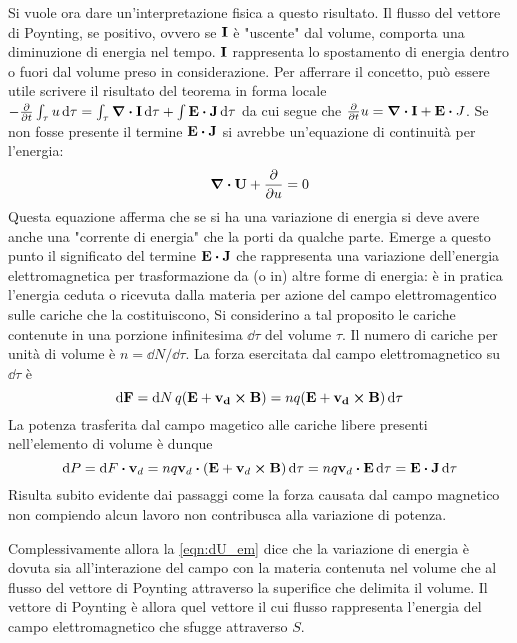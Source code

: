 Si vuole ora dare un'interpretazione fisica a questo risultato.
Il flusso del vettore di Poynting, se positivo, ovvero se $\vb{I}$ è "uscente" dal volume,
comporta una diminuzione di energia nel tempo. $\vb{I}$ rappresenta lo spostamento di
energia dentro o fuori dal volume preso in considerazione. Per afferrare il concetto, può essere
utile scrivere il risultato del teorema in forma locale
$-\pdv{t}\int_\tau u \dd{\tau}=\int_\tau \div{\vb{I}} \dd{\tau} +\int \vb{E}\vdot\vb{J}\dd{\tau}$
da cui segue che $\-\pdv{t}u=\div{\vb{I}}+\vb{E}\vdot{J}$. Se non fosse presente il termine
$\vb{E}\vdot\vb{J}$ si avrebbe un'equazione di continuità per l'energia:
\[
    \div{\vb{U}}+\pdv{u}=0
\]
Questa equazione afferma che se si ha una variazione di energia si deve avere anche una "corrente di energia"
che la porti da qualche parte. Emerge a questo punto il significato del termine $\vb{E}\vdot\vb{J}$ che
rappresenta una variazione dell'energia elettromagnetica per trasformazione da (o in) altre forme di energia: è
in pratica l'energia ceduta o ricevuta dalla materia per azione del campo elettromagentico sulle cariche che
la costituiscono,
Si considerino a tal proposito le cariche contenute in una
porzione infinitesima $\dd{\tau}$ del volume $\tau$. Il numero di cariche per unità di volume
è $n=\dd{N}/\dd{\tau}$. La forza esercitata dal campo elettromagnetico su $\dd{\tau}$ è
\[
    \dd{\vb{F}}=\dd{N}q(\vb{E+\vb{v}_d\cp\vb{B}})=nq(\vb{E+\vb{v}_d\cp\vb{B}})\dd{\tau}
\]
La potenza trasferita dal campo magetico alle cariche libere presenti nell'elemento di volume è dunque
\begin{equation}
    \dd{P}=\dd{F}\vdot\vb{v}_d=nq\vb{v}_d\vdot (\vb{E}+\vb{v}_d\cp\vb{B})\dd{\tau}=nq\vb{v}_d\vdot \vb{E} \dd{\tau}=\vb{E}\vdot\vb{J}\dd{\tau}
    \label{eqn:potenza_em}
\end{equation}
Risulta subito evidente dai passaggi come la forza causata dal campo magnetico
non compiendo alcun lavoro non contribusca alla variazione di potenza.

Complessivamente allora la \eqref{eqn:dU_em} dice che la variazione di energia è dovuta sia all'interazione
del campo con la materia contenuta nel volume che al flusso del vettore di Poynting attraverso la superifice
che delimita il volume. Il vettore di Poynting è allora quel
vettore il cui flusso rappresenta l'energia del campo elettromagnetico che sfugge attraverso $S$.
